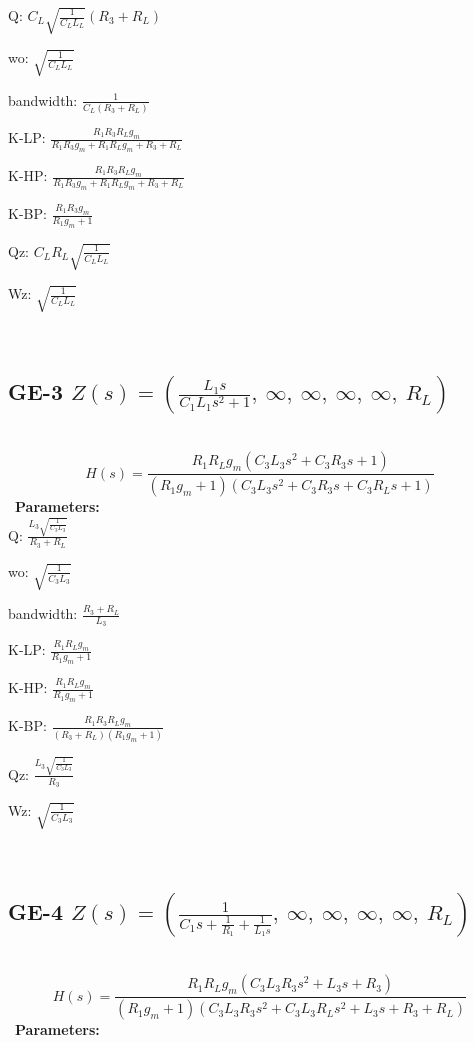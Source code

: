\documentclass{article}
\begin{document}
Q: $C_{L} \sqrt{\frac{1}{C_{L} L_{L}}} \left(R_{3} + R_{L}\right)$\ 

wo: $\sqrt{\frac{1}{C_{L} L_{L}}}$\ 

bandwidth: $\frac{1}{C_{L} \left(R_{3} + R_{L}\right)}$\ 

K-LP: $\frac{R_{1} R_{3} R_{L} g_{m}}{R_{1} R_{3} g_{m} + R_{1} R_{L} g_{m} + R_{3} + R_{L}}$\ 

K-HP: $\frac{R_{1} R_{3} R_{L} g_{m}}{R_{1} R_{3} g_{m} + R_{1} R_{L} g_{m} + R_{3} + R_{L}}$\ 

K-BP: $\frac{R_{1} R_{3} g_{m}}{R_{1} g_{m} + 1}$\ 

Qz: $C_{L} R_{L} \sqrt{\frac{1}{C_{L} L_{L}}}$\ 

Wz: $\sqrt{\frac{1}{C_{L} L_{L}}}$\ 

\ 

\subsection{GE-3 $Z(s) = \left( \frac{L_{1} s}{C_{1} L_{1} s^{2} + 1}, \  \infty, \  \infty, \  \infty, \  \infty, \  R_{L}\right)$ } \ 
\textbf{\[H(s) = \frac{R_{1} R_{L} g_{m} \left(C_{3} L_{3} s^{2} + C_{3} R_{3} s + 1\right)}{\left(R_{1} g_{m} + 1\right) \left(C_{3} L_{3} s^{2} + C_{3} R_{3} s + C_{3} R_{L} s + 1\right)}\] } \ 
\textbf{Parameters:}\\ 

Q: $\frac{L_{3} \sqrt{\frac{1}{C_{3} L_{3}}}}{R_{3} + R_{L}}$\ 

wo: $\sqrt{\frac{1}{C_{3} L_{3}}}$\ 

bandwidth: $\frac{R_{3} + R_{L}}{L_{3}}$\ 

K-LP: $\frac{R_{1} R_{L} g_{m}}{R_{1} g_{m} + 1}$\ 

K-HP: $\frac{R_{1} R_{L} g_{m}}{R_{1} g_{m} + 1}$\ 

K-BP: $\frac{R_{1} R_{3} R_{L} g_{m}}{\left(R_{3} + R_{L}\right) \left(R_{1} g_{m} + 1\right)}$\ 

Qz: $\frac{L_{3} \sqrt{\frac{1}{C_{3} L_{3}}}}{R_{3}}$\ 

Wz: $\sqrt{\frac{1}{C_{3} L_{3}}}$\ 

\ 

\subsection{GE-4 $Z(s) = \left( \frac{1}{C_{1} s + \frac{1}{R_{1}} + \frac{1}{L_{1} s}}, \  \infty, \  \infty, \  \infty, \  \infty, \  R_{L}\right)$ } \ 
\textbf{\[H(s) = \frac{R_{1} R_{L} g_{m} \left(C_{3} L_{3} R_{3} s^{2} + L_{3} s + R_{3}\right)}{\left(R_{1} g_{m} + 1\right) \left(C_{3} L_{3} R_{3} s^{2} + C_{3} L_{3} R_{L} s^{2} + L_{3} s + R_{3} + R_{L}\right)}\] } \ 
\textbf{Parameters:}\\ 
\end{document}
